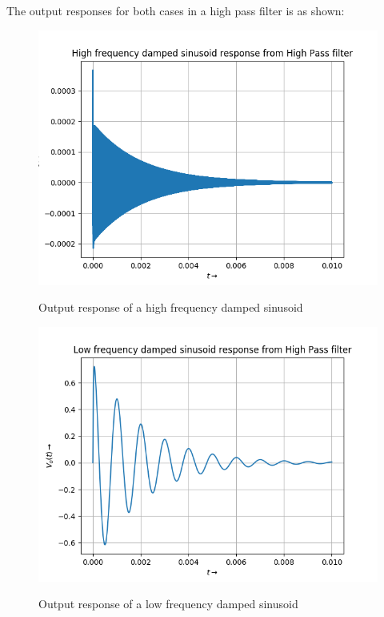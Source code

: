 \documentclass[11pt, a4paper]{article}
\begin{document}
The output responses for both cases in a high pass filter is as shown:\newpage
\begin{figure}[!tbh]
   	\centering
   	\includegraphics[scale=0.6]{Figure_6.png}
   	\label{fig:32}
   	\caption{Output response of a high frequency damped sinusoid}
   \end{figure}
\begin{figure}[!tbh]
   	\centering
   	\includegraphics[scale=0.6]{Figure_7.png}
   	\label{fig:32}
   	\caption{Output response of a low frequency damped sinusoid}
   \end{figure}
\end{document}
